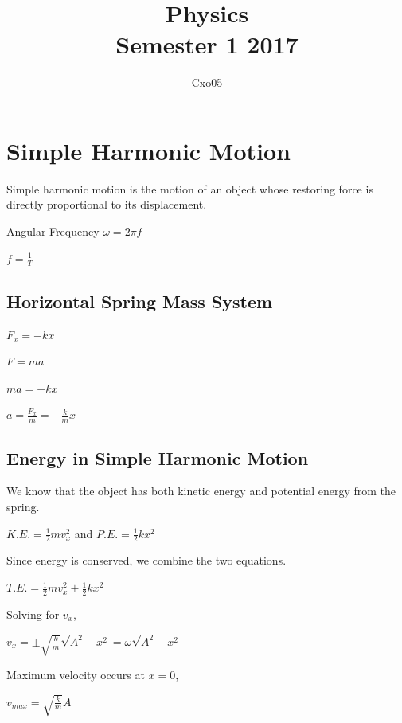 \documentclass[a4paper]{article}
\begin{document}
\title{
Physics \\
\large Semester 1 2017
}
\author{Cxo05}

\maketitle

\section{Simple Harmonic Motion}
Simple harmonic motion is the motion of an object whose restoring force is directly proportional to its displacement.

\begin{center}
Angular Frequency $\omega = 2\pi f$
\end{center}

\begin{center}
$f = \displaystyle\frac{1}{T}$
\end{center}

\subsection{Horizontal Spring Mass System}
\begin{center}
$F_{x} = -kx$
\end{center}

\begin{center}
$F = ma$
\end{center}

\begin{center}
$ma = -kx$
\end{center}

\begin{center}
$
a = \displaystyle\frac{F_{x}}{m} = -\frac{k}{m}x
$
\end{center}

\subsection{Energy in Simple Harmonic Motion}
We know that the object has both kinetic energy and potential energy from the spring.
\begin{center}
$K.E. = \displaystyle\frac{1}{2} mv_{x}^{2}$ and $P.E. = \displaystyle\frac{1}{2}kx^{2}$
\end{center}
Since energy is conserved, we combine the two equations.
\begin{center}
$T.E. = \displaystyle\frac{1}{2} mv_{x}^{2} + \frac{1}{2}kx^{2}$
\end{center}
Solving for $v_{x}$,
\begin{center}
$v_{x} = \displaystyle \pm\sqrt{\frac{k}{m}}\sqrt{A^{2}-x^{2}} = \omega\sqrt{A^{2}-x^{2}}$
\end{center}
Maximum velocity occurs at $x = 0$,
\begin{center}
$v_{max} = \displaystyle \sqrt{\frac{k}{m}}A$
\end{center}
\end{document}
